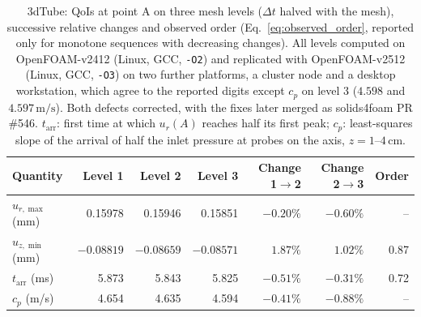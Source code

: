 \begin{table}[htbp]
	\centering
	\small
	\setlength{\tabcolsep}{4pt}
	\caption{3dTube: QoIs at point A on three mesh levels ($\Delta t$ halved with the mesh), successive relative changes and observed order (Eq.~\eqref{eq:observed_order}, reported only for monotone sequences with decreasing changes). All levels computed on OpenFOAM-v2412 (Linux, GCC, \texttt{-O2}) and replicated with OpenFOAM-v2512 (Linux, GCC, \texttt{-O3}) on two further platforms, a cluster node and a desktop workstation, which agree to the reported digits except $c_p$ on level 3 ($4.598$ and $4.597\,\mathrm{m/s}$). Both defects corrected, with the fixes later merged as solids4foam PR \#546. $t_\mathrm{arr}$: first time at which $u_r(A)$ reaches half its first peak; $c_p$: least-squares slope of the arrival of half the inlet pressure at probes on the axis, $z = 1$--$4\,\mathrm{cm}$.}
	\label{tab:3dtube}
	\begin{tabular}{lrrrrrr}
		\toprule
		Quantity & Level 1 & Level 2 & Level 3 & Change 1$\to$2 & Change 2$\to$3 & Order \\
		\midrule
		$u_{r,\max}$ (mm) & 0.15978 & 0.15946 & 0.15851 & $-0.20\%$ & $-0.60\%$ & -- \\
		$u_{z,\min}$ (mm) & $-0.08819$ & $-0.08659$ & $-0.08571$ & $1.87\%$ & $1.02\%$ & 0.87 \\
		$t_\mathrm{arr}$ (ms) & 5.873 & 5.843 & 5.825 & $-0.51\%$ & $-0.31\%$ & 0.72 \\
		$c_p$ (m/s) & 4.654 & 4.635 & 4.594 & $-0.41\%$ & $-0.88\%$ & -- \\
		\bottomrule
	\end{tabular}
\end{table}

